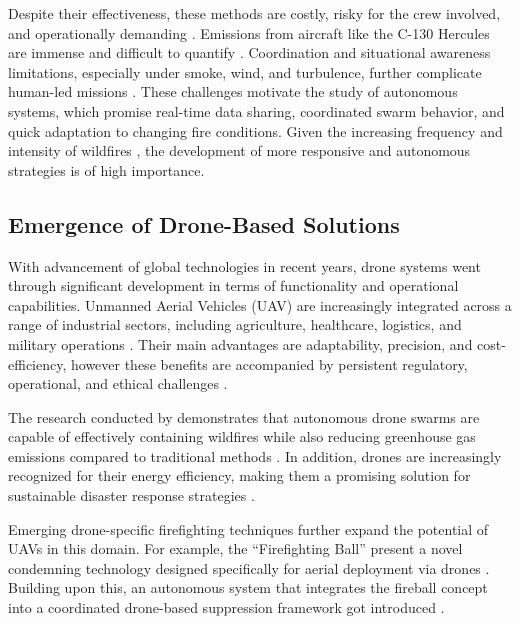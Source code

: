 \documentclass[11pt, a4paper]{article}
\begin{document}
Despite their effectiveness, these methods are costly, risky for the crew involved, and operationally demanding \citep[p. 1896]{struminskaFlightPerformanceAnalysis2024}. Emissions from aircraft like the C-130 Hercules are immense and difficult to quantify \citep{LockheedC130Hercules2022,spicerRapidMeasurementEmissions2009}.
Coordination and situational awareness limitations, especially under smoke, wind, and turbulence, further complicate human-led missions \citep{struminskaFlightPerformanceAnalysis2024}. 
These challenges motivate the study of autonomous systems, which promise real-time data sharing, coordinated swarm behavior, and quick adaptation to changing fire conditions. Given the increasing frequency and intensity of wildfires \citep{copernicus-wildfires,IPCC2023,grassland_Wildfires}, the development of more responsive and autonomous strategies is of high importance.

\subsection{Emergence of Drone-Based Solutions}

With advancement of global technologies in recent years, drone systems went through significant development in terms of functionality and operational capabilities. Unmanned Aerial Vehicles (UAV) are increasingly integrated across a range of industrial sectors, including agriculture, healthcare, logistics, and military operations \citep{emimiCurrentOpportunitiesChallenges2023}. Their main advantages are adaptability, precision, and cost-efficiency, however these benefits are accompanied by persistent regulatory, operational, and ethical challenges \citep{emimiCurrentOpportunitiesChallenges2023}.

The research conducted by \citet*{Saffre2022} demonstrates that autonomous drone swarms are capable of effectively containing wildfires while also reducing greenhouse gas emissions compared to traditional methods \citep{Saffre2022}. In addition, drones are increasingly recognized for their energy efficiency, making them a promising solution for sustainable disaster response strategies \citep{stolaroffEnergyUseLife2018}.

Emerging drone-specific firefighting techniques further expand the potential of UAVs in this domain. For example, the ``Firefighting Ball'' present a novel condemning technology designed specifically for aerial deployment via drones \citep{fireBalls}. Building upon this, an autonomous system that integrates the fireball concept into a coordinated drone-based suppression framework got introduced \citep{alkhatibProposedAutomaticForest2024}.
\end{document}
